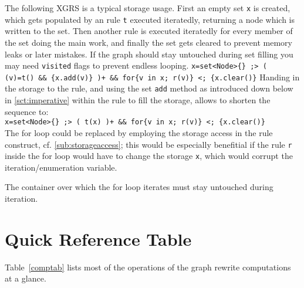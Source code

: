 \begin{example}
The following XGRS is a typical storage usage.
First an empty set \texttt{x} is created, which gets populated by an rule \texttt{t} executed iteratedly, returning a node which is written to the set.
Then another rule is executed iteratedly for every member of the set doing the main work, and finally the set gets cleared to prevent memory leaks or later mistakes.
If the graph should stay untouched during set filling you may need \texttt{visited} flags to prevent endless looping.
\verb#x=set<Node>{} ;> ( (v)=t() && {x.add(v)} )+ && for{v in x; r(v)} <; {x.clear()}#
Handing in the storage to the rule, and using the set \texttt{add} method as introduced down below in \ref{sct:imperative} within the rule to fill the storage, allows to shorten the sequence to:\\
\verb#x=set<Node>{} ;> ( t(x) )+ && for{v in x; r(v)} <; {x.clear()}#\\
The for loop could be replaced by employing the storage access in the rule construct, cf. \ref{sub:storageaccess}; this would be especially benefitial if the rule \texttt{r} inside the for loop would have to change the storage \texttt{x}, which would corrupt the iteration/enumeration variable.
\end{example}

\begin{warning}
The container over which the for loop iterates must stay untouched during iteration.
\end{warning}


\section{Quick Reference Table}

Table~\ref{comptab} lists most of the operations of the graph rewrite computations at a glance.

